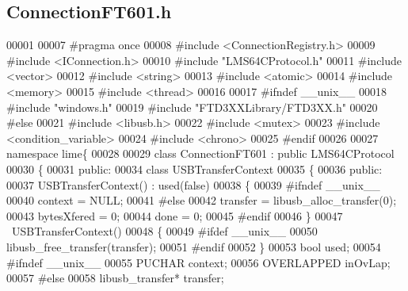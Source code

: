 \subsection{Connection\+F\+T601.\+h}
\label{ConnectionFT601_8h_source}

\begin{DoxyCode}
00001 
00007 \textcolor{preprocessor}{#pragma once}
00008 \textcolor{preprocessor}{#include <ConnectionRegistry.h>}
00009 \textcolor{preprocessor}{#include <IConnection.h>}
00010 \textcolor{preprocessor}{#include "LMS64CProtocol.h"}
00011 \textcolor{preprocessor}{#include <vector>}
00012 \textcolor{preprocessor}{#include <string>}
00013 \textcolor{preprocessor}{#include <atomic>}
00014 \textcolor{preprocessor}{#include <memory>}
00015 \textcolor{preprocessor}{#include <thread>}
00016 
00017 \textcolor{preprocessor}{#ifndef \_\_unix\_\_}
00018 \textcolor{preprocessor}{#include "windows.h"}
00019 \textcolor{preprocessor}{#include "FTD3XXLibrary/FTD3XX.h"}
00020 \textcolor{preprocessor}{#else}
00021 \textcolor{preprocessor}{#include <libusb.h>}
00022 \textcolor{preprocessor}{#include <mutex>}
00023 \textcolor{preprocessor}{#include <condition\_variable>}
00024 \textcolor{preprocessor}{#include <chrono>}
00025 \textcolor{preprocessor}{#endif}
00026 
00027 \textcolor{keyword}{namespace }lime\{
00028 
00029 \textcolor{keyword}{class }ConnectionFT601 : \textcolor{keyword}{public} LMS64CProtocol
00030 \{
00031 \textcolor{keyword}{public}:
00034     \textcolor{keyword}{class }USBTransferContext
00035     \{
00036     \textcolor{keyword}{public}:
00037         USBTransferContext() : used(false)
00038         \{
00039 \textcolor{preprocessor}{#ifndef \_\_unix\_\_}
00040             context = NULL;
00041 \textcolor{preprocessor}{#else}
00042             transfer = libusb\_alloc\_transfer(0);
00043             bytesXfered = 0;
00044             done = 0;
00045 \textcolor{preprocessor}{#endif}
00046         \}
00047         ~USBTransferContext()
00048         \{
00049 \textcolor{preprocessor}{#ifdef \_\_unix\_\_}
00050             libusb\_free\_transfer(transfer);
00051 \textcolor{preprocessor}{#endif}
00052         \}
00053         \textcolor{keywordtype}{bool} used;
00054 \textcolor{preprocessor}{#ifndef \_\_unix\_\_}
00055         PUCHAR context;
00056         OVERLAPPED inOvLap;
00057 \textcolor{preprocessor}{#else}
00058         libusb\_transfer* transfer;

\end{DoxyCode}
